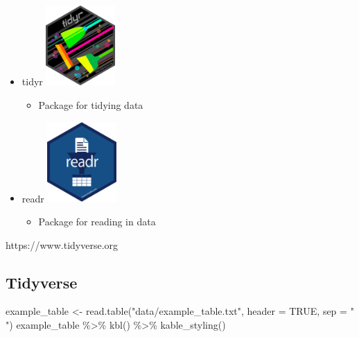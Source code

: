 \documentclass[
  letterpaper,
  DIV=11,
  numbers=noendperiod,
  landscape]{scrartcl}
\newenvironment{Shaded}{\begin{snugshade}}{\end{snugshade}}
\newcommand{\AttributeTok}[1]{\textcolor[rgb]{0.40,0.45,0.13}{#1}}
\newcommand{\ConstantTok}[1]{\textcolor[rgb]{0.56,0.35,0.01}{#1}}
\newcommand{\FunctionTok}[1]{\textcolor[rgb]{0.28,0.35,0.67}{#1}}
\newcommand{\NormalTok}[1]{\textcolor[rgb]{0.00,0.23,0.31}{#1}}
\newcommand{\OtherTok}[1]{\textcolor[rgb]{0.00,0.23,0.31}{#1}}
\newcommand{\SpecialCharTok}[1]{\textcolor[rgb]{0.37,0.37,0.37}{#1}}
\newcommand{\StringTok}[1]{\textcolor[rgb]{0.13,0.47,0.30}{#1}}
\providecommand{\tightlist}{%
  \setlength{\itemsep}{0pt}\setlength{\parskip}{0pt}}\usepackage{longtable,booktabs,array}
\begin{document}
\begin{itemize}
\item
  tidyr
  \includegraphics[width=1.04167in,height=\textheight]{images/tidyr.png}

  \begin{itemize}
  \tightlist
  \item
    Package for tidying data
  \end{itemize}
\item
  readr
  \includegraphics[width=1.04167in,height=\textheight]{images/readr.png}

  \begin{itemize}
  \tightlist
  \item
    Package for reading in data
  \end{itemize}
\end{itemize}

https://www.tidyverse.org

\hypertarget{tidyverse-2}{%
\subsection{Tidyverse}\label{tidyverse-2}}

\begin{Shaded}
\begin{Highlighting}[]
\NormalTok{example\_table }\OtherTok{\textless{}{-}} \FunctionTok{read.table}\NormalTok{(}\StringTok{"data/example\_table.txt"}\NormalTok{, }\AttributeTok{header =} \ConstantTok{TRUE}\NormalTok{, }\AttributeTok{sep =} \StringTok{" "}\NormalTok{)}
\NormalTok{example\_table  }\SpecialCharTok{\%\textgreater{}\%}
  \FunctionTok{kbl}\NormalTok{() }\SpecialCharTok{\%\textgreater{}\%}
  \FunctionTok{kable\_styling}\NormalTok{()}
\end{Highlighting}
\end{Shaded}
\end{document}
